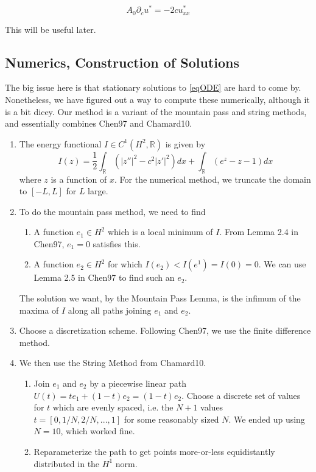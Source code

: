 \documentclass[12pt]{article}
\def\R{{\mathbb R}}
\begin{document}
\begin{equation}\label{uc}
A_0 \partial_c u^* = -2 c u^*_{xx}
\end{equation}

This will be useful later.

\subsection{Numerics, Construction of Solutions}

The big issue here is that stationary solutions to \eqref{eqODE} are hard to come by. Nonetheless, we have figured out a way to compute these numerically, although it is a bit dicey. Our method is a variant of the mountain pass and string methods, and essentially combines Chen97 and Chamard10.

\begin{enumerate}
	\item The energy functional $I \in C^1(H^2, \R)$ is given by
	\begin{equation}
	I(z) = \frac{1}{2} \int_\R (|z''|^2 - c^2 |z'|^2)dx 
	+ \int_\R (e^z - z - 1) dx
	\end{equation}
	where $z$ is a function of $x$. For the numerical method, we truncate the domain to $[-L, L]$ for $L$ large.
	\item To do the mountain pass method, we need to find
	\begin{enumerate}
		\item A function $e_1 \in H^2$ which is a local minimum of $I$. From Lemma 2.4 in Chen97, $e_1 = 0$ satisfies this.
		\item A function $e_2 \in H^2$ for which $I(e_2) < I(e^1) = I(0) = 0$. We can use Lemma 2.5 in Chen97 to find such an $e_2$. 
	\end{enumerate} 
	The solution we want, by the Mountain Pass Lemma, is the infimum of the maxima of $I$ along all paths joining $e_1$ and $e_2$.
	\item Choose a discretization scheme. Following Chen97, we use the finite difference method.
	\item We then use the String Method from Chamard10.
	\begin{enumerate}
		\item Join $e_1$ and $e_2$ by a piecewise linear path $U(t) = t e_1 + (1-t) e_2 = (1-t)e_2$. Choose a discrete set of values for $t$ which are evenly spaced, i.e. the $N+1$ values $t = [0, 1/N, 2/N, ..., 1]$ for some reasonably sized $N$. We ended up using $N = 10$, which worked fine.
		\item Reparameterize the path to get points more-or-less equidistantly distributed in the $H^1$ norm.

\end{enumerate}
\end{enumerate}
\end{document}
